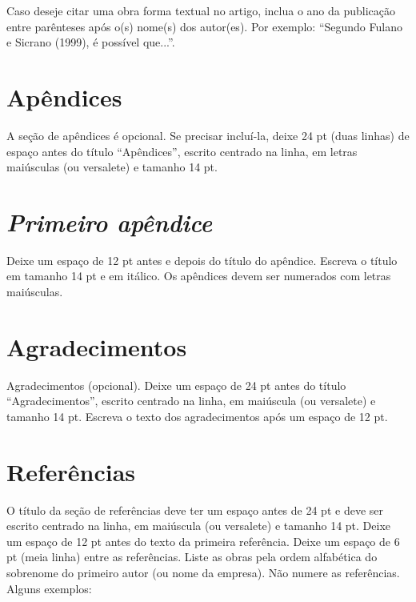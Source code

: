 \documentclass[
	article,			%
	12pt,				%
	oneside,			%
	a4paper,			%
	english,			%
	brazil,				%
	sumario=tradicional
	]{abntex2}
\begin{document}
Caso deseje citar uma obra forma textual no artigo, inclua o ano da publicação entre parênteses após o(s) nome(s) dos autor(es).  Por exemplo: “Segundo Fulano e Sicrano (1999), é possível que...”.



\appendix
\section*{Apêndices}
 
A seção de apêndices é opcional.  Se precisar incluí-la, deixe 24 pt (duas linhas) de espaço antes do título “Apêndices”,  escrito centrado na linha, em letras maiúsculas (ou versalete) e tamanho 14 pt.
 
\renewcommand{\thesection}{\textit{\Alph{section}} }
\section{\textit{Primeiro apêndice}}
 
Deixe um espaço de 12 pt antes e depois do título do apêndice.  Escreva o título em tamanho 14 pt e em itálico.  Os apêndices devem ser numerados com letras maiúsculas.


\section*{Agradecimentos}

Agradecimentos (opcional).  Deixe um espaço de 24 pt antes do título “Agradecimentos”, escrito centrado na linha, em maiúscula (ou versalete) e tamanho 14 pt.  Escreva o texto dos agradecimentos após um espaço de 12 pt.

\section*{Referências}

O título da seção de referências deve ter um espaço antes de 24 pt e deve ser escrito centrado na linha, em maiúscula (ou versalete) e tamanho 14 pt.  Deixe um espaço de 12 pt antes do texto da primeira referência.  Deixe um espaço de 6 pt (meia linha) entre as referências.
Liste as obras pela ordem alfabética do sobrenome do primeiro autor (ou nome da empresa).  Não numere as referências.  Alguns exemplos:
\end{document}
